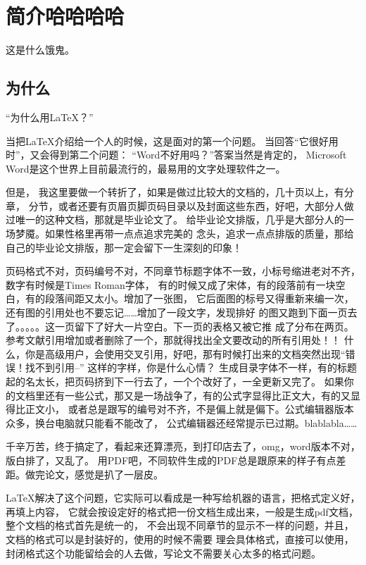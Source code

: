 \chapter{简介哈哈哈哈}

这是什么饿鬼。

\section{为什么}

“为什么用\LaTeX{}{}？”

当把\LaTeX{}{}介绍给一个人的时候，这是面对的第一个问题。
当回答“它很好用时”，又会得到第二个问题：
“Word不好用吗？”答案当然是肯定的，
Microsoft Word是这个世界上目前最流行的，最易用的文字处理软件之一。

但是，
我这里要做一个转折了，如果是做过比较大的文档的，几十页以上，有分章，
分节，或者还要有页眉页脚页码目录以及封面这些东西，好吧，大部分人做过唯一的这种文档，那就是毕业论文了。
给毕业论文排版，几乎是大部分人的一场梦魇。如果性格里再带一点点追求完美的
念头，追求一点点排版的质量，那给自己的毕业论文排版，那一定会留下一生深刻的印象！

页码格式不对，页码编号不对，不同章节标题字体不一致，小标号缩进老对不齐，
数字有时候是Times Roman字体，
有的时候又成了宋体，有的段落前有一块空白，有的段落间距又太小。增加了一张图，
它后面图的标号又得重新来编一次，还有图的引用处也不要忘记……增加了一段文字，发现排好
的图又跑到下面一页去了。。。。。这一页留下了好大一片空白。下一页的表格又被它推
成了分布在两页。参考文献引用增加或者删除了一个，那就得找出全文要改动的所有引用处！！
什么，你是高级用户，会使用交叉引用，好吧，那有时候打出来的文档突然出现“错误！找不到引用--”
这样的字样，你是什么心情？
生成目录字体不一样，有的标题起的名太长，把页码挤到下一行去了，一个个改好了，一全更新又完了。
如果你的文档里还有一些公式，那又是一场战争了，有的公式字显得比正文大，有的又显得比正文小，
或者总是跟写的编号对不齐，不是偏上就是偏下。公式编辑器版本众多，换台电脑就只能看不能改了，
公式编辑器还经常提示已过期。blablabla……

千辛万苦，终于搞定了，看起来还算漂亮，到打印店去了，omg，word版本不对，版白排了，又乱了。
用PDF吧，不同软件生成的PDF总是跟原来的样子有点差距。做完论文，感觉是扒了一层皮。

\LaTeX{}解决了这个问题，它实际可以看成是一种写给机器的语言，把格式定义好，再填上内容，
它就会按设定好的格式把一份文档生成出来，一般是生成pdf文档，整个文档的格式首先是统一的，
不会出现不同章节的显示不一样的问题，并且，文档的格式可以是封装好的，使用的时候不需要
理会具体格式，直接可以使用，封闭格式这个功能留给会的人去做，写论文不需要关心太多的格式问题。

